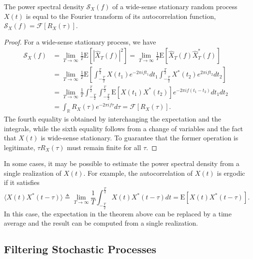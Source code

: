 \begin{theorem} \label{theorem:WienerKhinchin}
The power spectral density $\mathcal{S}_X (f)$ of a wide-sense stationary random process $X(t)$ is equal to the Fourier transform of its autocorrelation function, $\mathcal{S}_X (f) = \mathcal{F} [R_X (\tau)]$.
\end{theorem}
\begin{proof}
For a wide-sense stationary process, we have
\begin{equation*}
\begin{split}
\mathcal{S}_X(f) &= \lim_{T \rightarrow \infty} \frac{1}{T} \mathrm{E} \left[ |\hat{X}_T(f)|^2 \right]
= \lim_{T \rightarrow \infty} \frac{1}{T} \mathrm{E} \left[ \hat{X}_T(f) \hat{X}_T^*(f) \right] \\
&= \lim_{T \rightarrow \infty} \frac{1}{T} \mathrm{E} \left[
\int_{-\frac{T}{2}}^{\frac{T}{2}} X(t_1) e^{-2 \pi i f t_1} dt_1
\int_{-\frac{T}{2}}^{\frac{T}{2}} X^*(t_2) e^{2 \pi i f t_2} dt_2 \right] \\
&= \lim_{T \rightarrow \infty} \frac{1}{T}
\int_{-\frac{T}{2}}^{\frac{T}{2}} \int_{-\frac{T}{2}}^{\frac{T}{2}}
\mathrm{E} \left[ X(t_1) X^*(t_2) \right]
e^{-2 \pi i f (t_1-t_2)} dt_1 dt_2 \\
&= \int_{\mathbb{R}} R_X (\tau) e^{-2 \pi i f\tau} d\tau
= \mathcal{F} [ R_X (\tau) ] .
\end{split}
\end{equation*}
The fourth equality is obtained by interchanging the expectation and the integrals, while the sixth equality follows from a change of variables and the fact that $X(t)$ is wide-sense stationary.
To guarantee that the former operation is legitimate, $\tau R_X(\tau)$ must remain finite for all $\tau$.
\end{proof}

In some cases, it may be possible to estimate the power spectral density from a single realization of $X(t)$.
For example, the autocorrelation of $X(t)$ is ergodic if it satisfies
\begin{equation*}
\langle X(t) X^* (t-\tau) \rangle \triangleq \lim_{T \rightarrow \infty} \frac{1}{T} \int_{- \frac{T}{2}}^{\frac{T}{2}} X(t) X^* (t-\tau) dt = \mathrm{E} \left[ X(t) X^*(t-\tau) \right].
\end{equation*}
In this case, the expectation in the theorem above can be replaced by a time average and the result can be computed from a single realization.

\subsection{Filtering Stochastic Processes}

